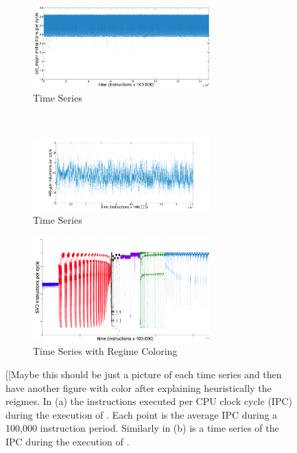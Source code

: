 \begin{figure}[htbp]
  \centering
  \begin{subfigure}[t]{\textwidth}
  \centering
    \includegraphics[width=0.75\textwidth]{figs/colFullTS}
    \caption{\col Time Series}
    \label{fig:col-ts}
  \end{subfigure}%
  \\
  
  \begin{subfigure}[t]{\textwidth}
  \centering
    \includegraphics[width=0.75\textwidth]{figs/gccfullts}
    \caption{\gcc Time Series}
    \label{fig:gcc-ts}
  \end{subfigure}
    \begin{subfigure}[t]{\textwidth}
    \centering
    \includegraphics[width=0.75\textwidth]{figs/SVD1RegimesColored}
    \caption{\svd Time Series with Regime Coloring}
    \label{fig:svd-ts-colored}
  \end{subfigure}
  \caption{[[Maybe this should be just a picture of each time series and then have another figure with color after explaining heuristically the reigmes. In (a) the instructions executed per CPU clock cycle
    (IPC) during the execution of \col. Each point is the average IPC during a 100,000
    instruction period. Similarly in (b) is a time series of the IPC during the execution of \gcc.}\label{fig:sample-ts}
    \end{figure}
